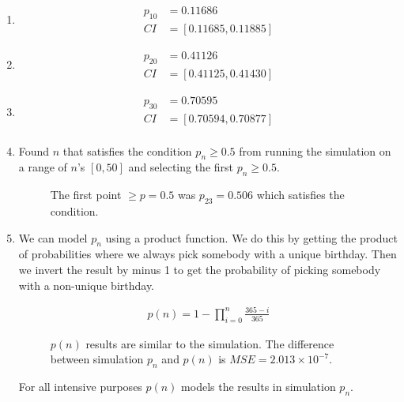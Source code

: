 \documentclass[twocolumn]{article}
\begin{document}
\begin{enumerate}[label=\alph*),itemsep=-1.5em]
    
\item 
\begin{align*}
p_{10} &= 0.11686 \\
CI &= [0.11685, 0.11885]
\end{align*}


\item 
\begin{align*}
p_{20} &=  0.41126 \\
CI &= [0.41125, 0.41430]
\end{align*}


\item
\begin{align*}
p_{30} &= 0.70595 \\
CI &= [0.70594, 0.70877]\\
\end{align*}

\item 
Found $n$ that satisfies the condition $p_n \ge 0.5$ from running the simulation on a range of $n$'s $[0, 50]$ and selecting the first $p_n \ge 0.5$.

\vspace{-5pt}
\begin{figure}[H]
    \centering
    \caption{The first point $\geq p=0.5$ was $p_{23}=0.506$ which satisfies the condition.}
\end{figure}




\item 
We can model $p_n$ using a product function. We do this by getting the product of probabilities where we always pick somebody with a unique birthday. Then we invert the result by minus 1 to get the probability of picking somebody with a non-unique birthday.

\vspace{-10pt}
\begin{align*}
p(n) = 1 - \prod_{i=0}^{n} \frac{\text{365} - i}{365}
\end{align*}
\vspace{-10pt}

\begin{figure}[H]
    \centering
    \caption{$p(n)$ results are similar to the simulation. The difference between simulation $p_n$ and $p(n)$ is $MSE = 2.013\times10^{-7}$.}
\end{figure}
\vspace{-14pt}
For all intensive purposes $p(n)$ models the results in simulation $p_n$. 

\end{enumerate}
\end{document}

